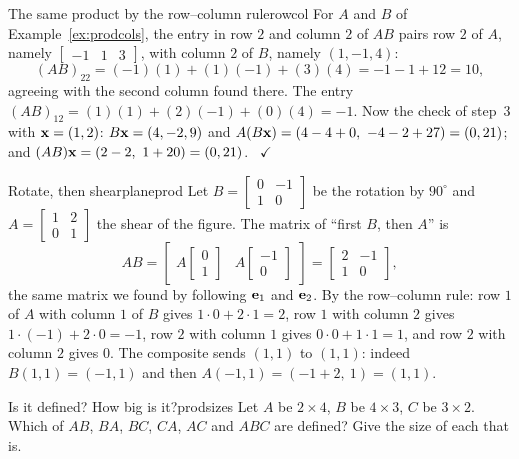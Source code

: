 \documentclass[11pt]{article}
\begin{document}
\begin{exmp}{The same product by the row--column rule}{rowcol}
For $A$ and $B$ of Example~\ref{ex:prodcols}, the entry in row $2$ and column $2$ of $AB$ pairs row $2$ of $A$, namely $\begin{bmatrix}-1&1&3\end{bmatrix}$, with column $2$ of $B$, namely $(1,-1,4)$:
\[
(AB)_{22}=(-1)(1)+(1)(-1)+(3)(4)=-1-1+12=10,
\]
agreeing with the second column found there. The entry $(AB)_{12}=(1)(1)+(2)(-1)+(0)(4)=-1$. Now the check of step~3 with $\mathbf{x}=(1,2)$: $B\mathbf{x}=(4,-2,9)$ and $A(B\mathbf{x})=(4-4+0,\ -4-2+27)=(0,21)$; and $(AB)\mathbf{x}=(2-2,\ 1+20)=(0,21)$. \ $\checkmark$
\end{exmp}

\begin{exmp}{Rotate, then shear}{planeprod}
Let $B=\begin{bmatrix}0&-1\\1&0\end{bmatrix}$ be the rotation by $90^\circ$ and $A=\begin{bmatrix}1&2\\0&1\end{bmatrix}$ the shear of the figure. The matrix of ``first $B$, then $A$'' is
\[
AB=\begin{bmatrix}A\begin{bmatrix}0\\1\end{bmatrix}&A\begin{bmatrix}-1\\0\end{bmatrix}\end{bmatrix}=\begin{bmatrix}2&-1\\1&0\end{bmatrix},
\]
the same matrix we found by following $\mathbf{e}_1$ and $\mathbf{e}_2$. By the row--column rule: row $1$ of $A$ with column $1$ of $B$ gives $1\cdot0+2\cdot1=2$, row $1$ with column $2$ gives $1\cdot(-1)+2\cdot0=-1$, row $2$ with column $1$ gives $0\cdot0+1\cdot1=1$, and row $2$ with column $2$ gives $0$. The composite sends $(1,1)$ to $(1,1)$: indeed $B(1,1)=(-1,1)$ and then $A(-1,1)=(-1+2,\ 1)=(1,1)$.
\end{exmp}

\begin{kc}{Is it defined? How big is it?}{prodsizes}
Let $A$ be $2\times4$, $B$ be $4\times3$, $C$ be $3\times2$. Which of $AB$, $BA$, $BC$, $CA$, $AC$ and $ABC$ are defined? Give the size of each that is.
\end{kc}
\end{document}
